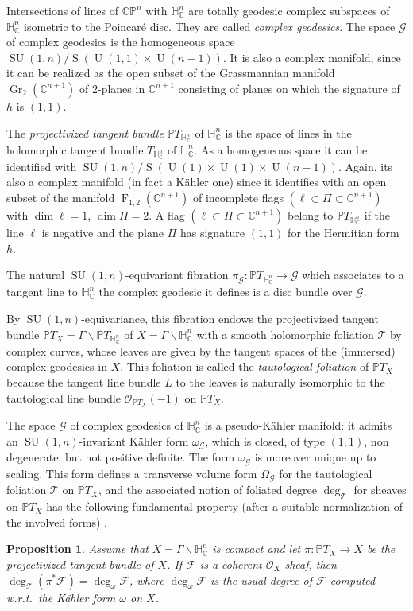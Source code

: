 \documentclass[10pt]{amsart}
\let\mathcal\mathscr
\newcommand{\citestar}[3]{\cite[#3]{#1}}
\theoremstyle{plain}
\newtheorem{prop}[theo]{Proposition}
\theoremstyle{definition}
\DeclareMathOperator{\rF}{F}
\DeclareMathOperator{\Gr}{Gr}
\DeclareMathOperator{\rS}{S}
\DeclareMathOperator{\SU}{SU}
\DeclareMathOperator{\rU}{U}
\newcommand{\cF}{\mathcal{F}}
\newcommand{\cG}{\mathcal{G}}
\newcommand{\cO}{\mathcal{O}}
\newcommand{\cT}{\mathcal{T}}
\newcommand{\bC}{\mathbb{C}}
\newcommand{\bCP}{\mathbb{CP}}
\newcommand{\HC}{{\mathbb{H}^n_\mathbb{C}}}
\newcommand{\THC}{T_{\HC}}
\newcommand{\PTX}{{\mathbb{P}T_X}}
\newcommand{\PTH}{\mathbb{P}T_{\mathbb{H}^n_\mathbb{C}}}
\newcommand{\OX}{\mathcal{O}_{\PTX}(-1)}
\begin{document}
Intersections of lines
of $\bCP^n$ with $\HC$ are totally geodesic complex subspaces of~$\HC$ isometric to the Poincaré
disc. They are called \emph{complex geodesics}. The space $\cG$ of complex geodesics is the
homogeneous space $\SU(1,n)/\rS(\rU(1,1)\times \rU(n-1))$. It is also a complex manifold, since it
can be realized as the open subset of the Grassmannian manifold $\Gr_2(\bC^{n+1})$ of
$2$-planes in $\bC^{n+1}$ consisting of planes on which the signature of $h$ is $(1,1)$.

The \emph{projectivized tangent bundle} $\PTH$ of $\HC$ is the space of lines in the holomorphic
tangent bundle $\THC$ of $\HC$. As a homogeneous space it can be identified with
$\SU(1,n)/\rS(\rU(1)\times\rU(1)\times \rU(n-1))$. Again, its also a complex manifold (in fact a Kähler one)
since it identifies with an open subset of the manifold $\rF_{1,2}(\bC^{n+1})$
of incomplete flags $(\ell\subset\Pi\subset\bC^{n+1})$ with
$\dim \ell=1$, $ \dim\Pi=2$. A flag $(\ell\subset\Pi\subset\bC^{n+1})$ belong to $\PTH$ if the line
$\ell$ is negative and the plane $\Pi$ has signature $(1,1)$ for the Hermitian form $h$.

The natural $\SU(1,n)$-equivariant fibration $\pi_{\cG}:\PTH\to\cG$ which associates
to a tangent line to $\HC$ the complex geodesic it defines is a
disc bundle over $\cG$.

By $\SU(1,n)$-equivariance, this fibration endows the projectivized tangent bundle
$\PTX=\Gamma\backslash\PTH$ of $X=\Gamma\backslash\HC$ with a smooth holomorphic foliation $\cT$ by
complex curves, whose
leaves are given by the tangent spaces of the (immersed) complex geodesics in $X$. This foliation is
called the \emph{tautological foliation} of $\PTX$ because the tangent line bundle $L$ to the leaves is
naturally isomorphic to the tautological line bundle $\OX$ on $\PTX$.

The space $\cG$ of complex geodesics of $\HC$ is a pseudo-Kähler manifold: it admits an
$\SU(1,n)$-invariant Kähler form $\omega_{\cG}$, which is closed, of type $(1,1)$, non degenerate,
but not positive definite. The form $\omega_{\cG}$ is moreover unique up to scaling. This form
defines a transverse volume form $\Omega_{\cG}$
for the tautological foliation $\cT$ on $\PTX$, and the associated notion of foliated degree
$\deg_\cT$ for sheaves on $\PTX$ has the following fundamental property (after a suitable
normalization of the involved forms)
\citestar{KM}*{Prop.\,3.1}.

\begin{prop}\label{prop:degT}
Assume that $X=\Gamma\backslash\HC$ is compact and let $\pi:\PTX\to X$ be the projectivized tangent
bundle of $X$. If
$\cF$ is a coherent $\cO_X$-sheaf, then $\deg_\cT(\pi^*\cF)=\deg_\omega\cF$, where $\deg_\omega\cF$ is the usual
degree of $\cF$ computed w.r.t.\ the Kähler form $\omega$ on $X$.
\end{prop}
\end{document}
